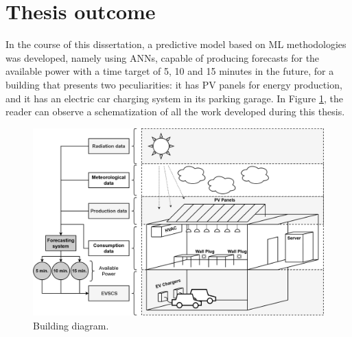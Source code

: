 \section{Thesis outcome}

In the course of this dissertation, a predictive model based on \ac{ML} methodologies was developed, namely using \ac{ANNs}, capable of producing forecasts for the available power with a time target of 5, 10 and 15 minutes in the future, for a building that presents two peculiarities: it has \ac{PV} panels for energy production, and it has an electric car charging system in its parking garage. In Figure \ref{building}, the reader can observe a schematization of all the work developed during this thesis. 

\begin{figure}[h!]
    \centering
    \begin{center}
    \includegraphics[width=1\textwidth]{Images/BUILDING.png}
    \caption{Building diagram.}
    \label{building}
    \end{center}
\end{figure}


